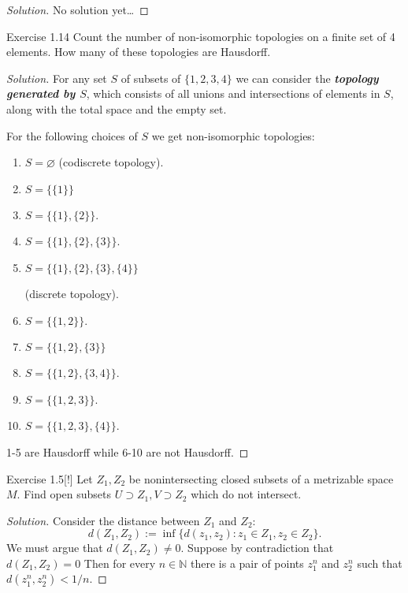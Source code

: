 \begin{proof}[Solution]\leavevmode
No solution yet…
\end{proof}

\begin{thing4}{Exercise 1.14}\leavevmode
	Count the number of non-isomorphic topologies on a finite set of 4 elements. How many of these topologies are Hausdorff.
\end{thing4}

\begin{proof}[Solution]\leavevmode
For any set $S$ of subsets of $\{1,2,3,4\}$ we can consider the \textit{\textbf{topology generated by $S$}}, which consists of all unions and intersections of elements in $S$, along with the total space and the empty set.

For the following choices of $S$ we get non-isomorphic topologies:
\begin{multicols}{2}
\begin{enumerate}
\item  $S=\varnothing$ (codiscrete topology).
\item $S=\Big\{\{1\}\Big\}$
\item $S=\Big\{\{1\},\{2\}\Big\}$.
\item $S=\Big\{\{1\},\{2\},\{3\}\Big\}$.
\item $S=\Big\{\{1\},\{2\},\{3\},\{4\}\Big\}$

	(discrete topology).
\columnbreak\item $S=\Big\{\{1,2\}\Big\}$.
\item $S=\Big\{\{1,2\},\{3\}\Big\}$
\item $S=\Big\{\{1,2\},\{3,4\}\Big\}$.
\item $S=\Big\{\{1,2,3\}\Big\}$.
\item $S=\Big\{\{1,2,3\},\{4\}\Big\}$.
\end{enumerate}
\end{multicols}
1-5 are Hausdorff while 6-10 are not Hausdorff. 
\end{proof}

\begin{thing4}{Exercise 1.5}[!]\leavevmode
	Let $Z_1,Z_2$ be nonintersecting closed subsets of a metrizable space $M$. Find open subsets $U \supset Z_1, V \supset Z_2$ which do not intersect.
\end{thing4}

\begin{proof}[Solution]\leavevmode
Consider the distance between $Z_1$ and $Z_2$:
\[d(Z_1,Z_2):=\operatorname{inf}\{d(z_1,z_2):z_1 \in Z_1, z_2 \in Z_2\}.\]
We must argue that $d(Z_1,Z_2) \neq 0$. Suppose by contradiction that $d(Z_1,Z_2) = 0$ Then for every  $n \in \mathbb{N}$ there is a pair of points $z_1^n$ and $z_2^n$ such that $d(z_1^n,z_2^n)<1/n$.
\end{proof}

